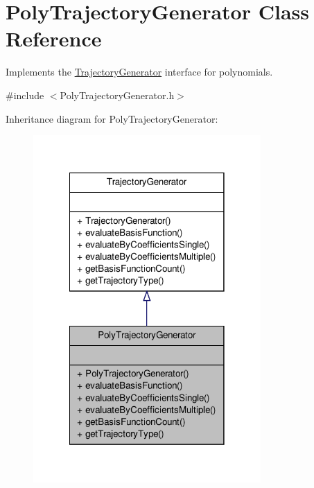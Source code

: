 \hypertarget{classPolyTrajectoryGenerator}{\section{\-Poly\-Trajectory\-Generator \-Class \-Reference}
\label{classPolyTrajectoryGenerator}
}


\-Implements the \hyperlink{classTrajectoryGenerator}{\-Trajectory\-Generator} interface for polynomials.  




{\ttfamily \#include $<$\-Poly\-Trajectory\-Generator.\-h$>$}



\-Inheritance diagram for \-Poly\-Trajectory\-Generator\-:\nopagebreak
\begin{figure}[H]
\begin{center}
\leavevmode
\includegraphics[width=246pt]{classPolyTrajectoryGenerator__inherit__graph}
\end{center}
\end{figure}


